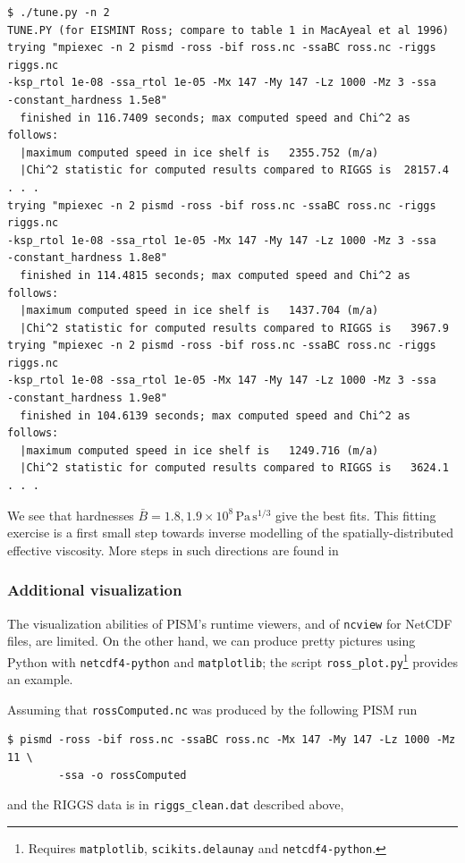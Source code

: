 \documentclass[11pt,final]{amsart}
\renewcommand{\t}[1]{\texttt{#1}}
\begin{document}
\small
\begin{verbatim}
$ ./tune.py -n 2
TUNE.PY (for EISMINT Ross; compare to table 1 in MacAyeal et al 1996)
trying "mpiexec -n 2 pismd -ross -bif ross.nc -ssaBC ross.nc -riggs riggs.nc
-ksp_rtol 1e-08 -ssa_rtol 1e-05 -Mx 147 -My 147 -Lz 1000 -Mz 3 -ssa
-constant_hardness 1.5e8"
  finished in 116.7409 seconds; max computed speed and Chi^2 as follows:
  |maximum computed speed in ice shelf is   2355.752 (m/a)
  |Chi^2 statistic for computed results compared to RIGGS is  28157.4
. . .
trying "mpiexec -n 2 pismd -ross -bif ross.nc -ssaBC ross.nc -riggs riggs.nc
-ksp_rtol 1e-08 -ssa_rtol 1e-05 -Mx 147 -My 147 -Lz 1000 -Mz 3 -ssa
-constant_hardness 1.8e8"
  finished in 114.4815 seconds; max computed speed and Chi^2 as follows:
  |maximum computed speed in ice shelf is   1437.704 (m/a)
  |Chi^2 statistic for computed results compared to RIGGS is   3967.9
trying "mpiexec -n 2 pismd -ross -bif ross.nc -ssaBC ross.nc -riggs riggs.nc
-ksp_rtol 1e-08 -ssa_rtol 1e-05 -Mx 147 -My 147 -Lz 1000 -Mz 3 -ssa
-constant_hardness 1.9e8"
  finished in 104.6139 seconds; max computed speed and Chi^2 as follows:
  |maximum computed speed in ice shelf is   1249.716 (m/a)
  |Chi^2 statistic for computed results compared to RIGGS is   3624.1
. . .
\end{verbatim}
\normalsize

We see that hardnesses $\bar B = 1.8,1.9 \times 10^8 \, \text{Pa}\, \text{s}^{1/3}$ give the best fits.  This fitting exercise is a first small step towards inverse modelling of the spatially-distributed effective viscosity.  More steps in such directions are found in \cite{HumbertGreveHutter,RommelaereMacAyeal}


\subsubsection*{Additional visualization}  The visualization abilities of PISM's runtime viewers, and of \verb|ncview| for NetCDF files, are limited.  On the other hand, we can produce pretty pictures using Python with \verb|netcdf4-python| and \verb|matplotlib|; the script \verb|ross_plot.py|\footnote{Requires \t{matplotlib}, \t{scikits.delaunay} and \t{netcdf4-python}.} provides an example.

Assuming that \verb|rossComputed.nc| was produced by the following PISM run

\begin{verbatim}
$ pismd -ross -bif ross.nc -ssaBC ross.nc -Mx 147 -My 147 -Lz 1000 -Mz 11 \
        -ssa -o rossComputed
\end{verbatim}
\noindent and the RIGGS data is in \verb|riggs_clean.dat| described above,
\end{document}
